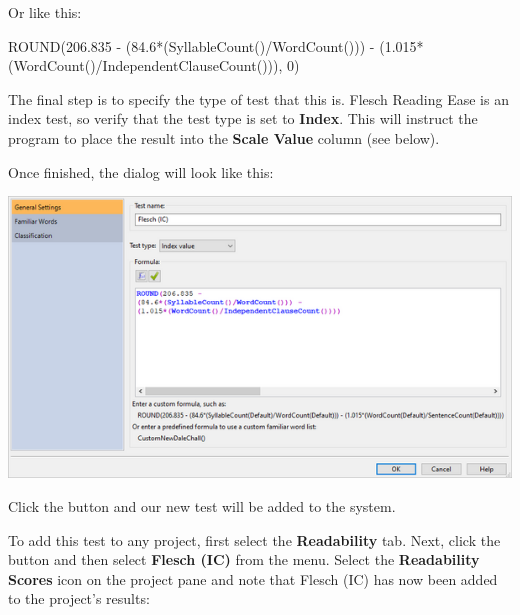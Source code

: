 \documentclass[
]{book}
\newenvironment{Shaded}{\begin{snugshade}}{\end{snugshade}}
\newcommand{\DecValTok}[1]{\textcolor[rgb]{0.00,0.00,0.81}{#1}}
\newcommand{\FloatTok}[1]{\textcolor[rgb]{0.00,0.00,0.81}{#1}}
\newcommand{\FunctionTok}[1]{\textcolor[rgb]{0.00,0.00,0.00}{#1}}
\newcommand{\NormalTok}[1]{#1}
\newcommand{\SpecialCharTok}[1]{\textcolor[rgb]{0.00,0.00,0.00}{#1}}
\theoremstyle{definition}
\theoremstyle{definition}
\theoremstyle{definition}
\theoremstyle{definition}
\theoremstyle{remark}
\begin{document}
Or like this:

\begin{Shaded}
\begin{Highlighting}[]
\FunctionTok{ROUND}\NormalTok{(}\FloatTok{206.835} \SpecialCharTok{{-}}\NormalTok{ (}\FloatTok{84.6}\SpecialCharTok{*}\NormalTok{(}\FunctionTok{SyllableCount}\NormalTok{()}\SpecialCharTok{/}\FunctionTok{WordCount}\NormalTok{())) }\SpecialCharTok{{-}}  
\NormalTok{    (}\FloatTok{1.015}\SpecialCharTok{*}\NormalTok{(}\FunctionTok{WordCount}\NormalTok{()}\SpecialCharTok{/}\FunctionTok{IndependentClauseCount}\NormalTok{())), }\DecValTok{0}\NormalTok{)}
\end{Highlighting}
\end{Shaded}

The final step is to specify the type of test that this is. Flesch Reading Ease is an index test, so verify that the test type is set to \textbf{Index}. This will instruct the program to place the result into the \textbf{Scale Value} column (see below).

Once finished, the dialog will look like this:

\includegraphics{Images/CustomTestExample1Finished.png}

Click the  button and our new test will be added to the system.

To add this test to any project, first select the \textbf{Readability} tab. Next, click the  button and then select \textbf{Flesch (IC)} from the menu. Select the \textbf{Readability Scores} icon on the project pane and note that Flesch (IC) has now been added to the project's results:
\end{document}
